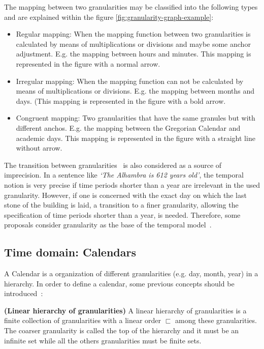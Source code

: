 The mapping between two granularities may be classified into the following types and are explained within the figure \ref{fig:granularity-graph-example}:
\begin{itemize}
\item
Regular mapping: When the mapping function between two granularities is calculated by means of multiplications or divisions and maybe some anchor adjustment. E.g. the mapping between hours and minutes. This mapping is represented in the figure with a normal arrow.
\item
Irregular mapping: When the mapping function can not be calculated by means of multiplications or divisions. E.g. the mapping between months and days. (This mapping is represented in the figure with a bold arrow.
\item
Congruent mapping: Two granularities that have the same granules but with different anchos. E.g. the mapping between the Gregorian Calendar and academic days. This mapping is represented in the figure with a straight line without arrow.
\end{itemize}

The transition between granularities~\cite{Lin97} is also considered as a source of imprecision. In a sentence like \emph{`The Alhambra is 612 years old'}, the temporal notion is very precise if time periods shorter than a year are irrelevant in the used granularity. However, if one is concerned with the exact day on which the last stone of the building is laid, a transition to a finer granularity, allowing the specification of time periods shorter than a year, is needed. Therefore, some proposals consider granularity as the base of the temporal model~\cite{Cru97}.



\subsection{\label{subsec:timedomain-calendar}Time domain: Calendars}
A Calendar is a organization of different granularities (e.g. day, month, year) in a hierarchy. 
In order to define a calendar, some previous concepts should be introduced~\cite{Kraus1997}:

\begin{definition}
\label{def:granularity-hierarchy}
\textbf{(Linear hierarchy of granularities)} A linear hierarchy of granularities is a finite collection of granularities with a linear order $\sqsubset$ among these granularities. The coarser granularity is called the top of the hierarchy and it must be an infinite set while all the others granularities must be finite sets.
\end{definition}

